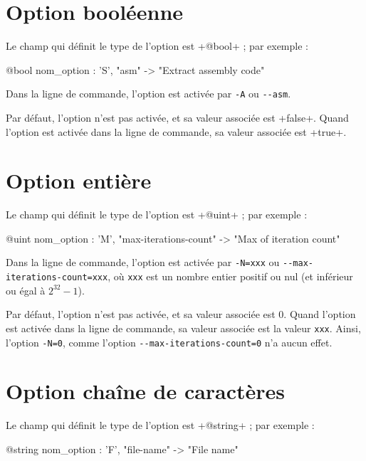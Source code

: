 \section{Option booléenne}

Le champ qui définit le type de l'option est \ggs+@bool+ ; par exemple :
\begin{galgascode}
  @bool nom_option : 'S', "asm" -> "Extract assembly code"
\end{galgascode}

Dans la ligne de commande, l'option est activée par \texttt{-A} ou \texttt{-{}-asm}.

Par défaut, l'option n'est pas activée, et sa valeur associée est \ggs+false+. Quand l'option est activée dans la ligne de commande, sa valeur associée est \ggs+true+.








\section{Option entière}

Le champ qui définit le type de l'option est \ggs+@uint+ ; par exemple :
\begin{galgascode}
  @uint nom_option : 'M', "max-iterations-count" -> "Max of iteration count"
\end{galgascode}

Dans la ligne de commande, l'option est activée par \texttt{-N=xxx} ou \texttt{-{}-max-iterations-count=xxx}, où \texttt{xxx} est un nombre entier positif ou nul (et inférieur ou égal à $2^{32}-1$).

Par défaut, l'option n'est pas activée, et sa valeur associée est $0$. Quand l'option est activée dans la ligne de commande, sa valeur associée est la valeur \texttt{xxx}. Ainsi, l'option \texttt{-N=0}, comme l'option \texttt{-{}-max-iterations-count=0} n'a aucun effet.










\section{Option chaîne de caractères}

Le champ qui définit le type de l'option est \ggs+@string+ ; par exemple :
\begin{galgascode}
  @string nom_option : 'F', "file-name" -> "File name"
\end{galgascode}

